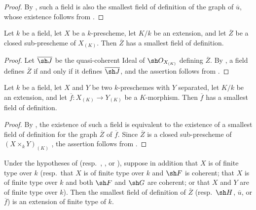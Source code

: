 \begin{proof}
By , such a field is also the smallest field of
definition of the graph of $\overline u$, whose existence follows
from .
\end{proof}


\begin{corollary}[4.8.11]
\label{IV.4.8.11}
Let $k$ be a field, let $X$ be a $k$-prescheme, let $K/k$ be an
extension, and let $\overline Z$ be a closed sub-prescheme of
$X_{(K)}$.
Then $\overline Z$ has a smallest field of definition.
\end{corollary}

\begin{proof}
Let $\overline{\sh J}$ be the quasi-coherent Ideal of
$\sh O_{X_{(K)}}$ defining $\overline Z$.
By , a field defines $\overline Z$ if and only if
it defines $\overline{\sh J}$, and the assertion follows from
.
\end{proof}

\begin{corollary}[4.8.12]
\label{IV.4.8.12}
Let $k$ be a field, let $X$ and $Y$ be two $k$-preschemes with $Y$
separated, let $K/k$ be an extension, and let
$\overline f:X_{(K)}\to Y_{(K)}$ be a $K$-morphism.
Then $\overline f$ has a smallest field of definition.
\end{corollary}

\begin{proof}
By , the existence of such a field is equivalent
to the existence of a smallest field of definition for the graph
$\overline Z$ of $\overline f$.
Since $\overline Z$ is a closed sub-prescheme of
$(X\times_kY)_{(K)}$ , the assertion follows from
.
\end{proof}

\begin{proposition}[4.8.13]
\label{IV.4.8.13}
Under the hypotheses of 
(resp.\ , , or
), suppose in addition that $X$ is of finite type
over $k$
(resp.\ that $X$ is of finite type over $k$ and $\sh F$ is coherent;
that $X$ is of finite type over $k$ and both $\sh F$ and $\sh G$ are
coherent; or that $X$ and $Y$ are of finite type over $k$).
Then the smallest field of definition of $\overline Z$
(resp.\ $\sh H$, $\overline u$, or $\overline f$) is an extension of
finite type of $k$.
\end{proposition}

